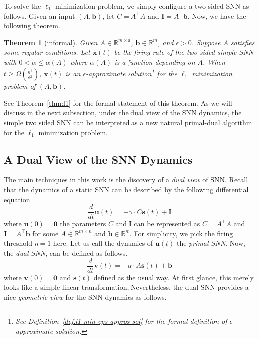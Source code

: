 \documentclass[11pt]{article}
\newtheorem{theorem}{Theorem}
\theoremstyle{remark}
\theoremstyle{definition}
\newcommand{\bx}{\mathbf{x}}
\newcommand{\bb}{\mathbf{b}}
\newcommand{\bv}{\mathbf{v}}
\newcommand{\bI}{\mathbf{I}}
\newcommand{\bu}{\mathbf{u}}
\newcommand{\bs}{\mathbf{s}}
\newcommand{\R}{{\mathbb R}} %
\begin{document}
To solve the $\ell_1$ minimization problem, we simply configure a two-sided SNN as follows. Given an input $(A,\bb)$, let $C=A^\top A$ and $\bI=A^\top\bb$. Now, we have the following theorem.

\begin{theorem}[informal]\label{thm: l1 informal}
	Given $A\in\R^{m\times n}$, $\bb\in\R^m$, and $\epsilon>0$. Suppose $A$ satisfies some regular conditions. Let $\bx(t)$ be the firing rate of the two-sided simple SNN with $0<\alpha\leq\alpha(A)$ where $\alpha(A)$ is a function depending on $A$. When $t\geq\Omega(\frac{n^3}{\epsilon^2})$, $\bx(t)$ is an $\epsilon$-approximate solution\footnote{See Definition~\ref{def:l1 min eps approx sol} for the formal definition of $\epsilon$-approximate solution.} for the $\ell_1$ minimization problem of $(A,\bb)$.
\end{theorem}

See Theorem~\ref{thm:l1} for the formal statement of this theorem.
As we will discuss in the next subsection, under the dual view of the SNN dynamics, the simple two sided SNN can be interpreted as a new natural primal-dual algorithm for the $\ell_1$ minimization problem.

\subsection{A Dual View of the SNN Dynamics} \label{subsec:dual-view}

The main techniques in this work is the discovery of a \textit{dual view} of SNN. Recall that the dynamics of a static SNN can be described by the following differential equation.
$$
\frac{d}{dt}\bu(t) = -\alpha\cdot C\bs(t) + \bI
$$
where $\bu(0)=\mathbf{0}$ the parameters $C$ and $\bI$ can be represented as $C=A^\top A$ and $\bI=A^\top\bb$ for some $A\in\R^{m\times n}$ and $\bb\in\R^m$. For simplicity, we pick the firing threshold $\eta=1$ here. Let us call the dynamics of $\bu(t)$ the \textit{primal SNN}. Now, the \textit{dual SNN}, can be defined as follows.
$$
\frac{d}{dt}\bv(t) = -\alpha\cdot A\bs(t) + \bb
$$
where $\bv(0)=\mathbf{0}$ and $\bs(t)$ defined as the usual way. At first glance, this merely looks like a simple linear transformation, Nevertheless, the dual SNN provides a nice \textit{geometric view} for the SNN dynamics as follows.
\end{document}
